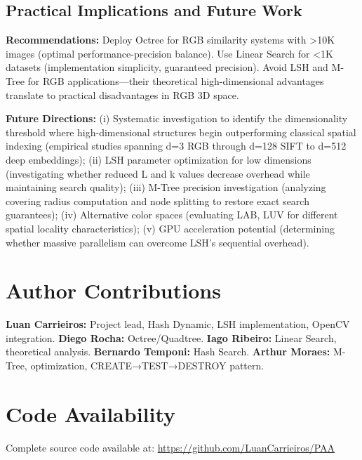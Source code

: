 \documentclass{sbc2023}
\begin{document}
\subsection{Practical Implications and Future Work}

\textbf{Recommendations:} Deploy Octree for RGB similarity systems with >10K images (optimal performance-precision balance). Use Linear Search for <1K datasets (implementation simplicity, guaranteed precision). Avoid LSH and M-Tree for RGB applications—their theoretical high-dimensional advantages translate to practical disadvantages in RGB 3D space.

\textbf{Future Directions:} (i) Systematic investigation to identify the dimensionality threshold where high-dimensional structures begin outperforming classical spatial indexing (empirical studies spanning d=3 RGB through d=128 SIFT to d=512 deep embeddings); (ii) LSH parameter optimization for low dimensions (investigating whether reduced L and k values decrease overhead while maintaining search quality); (iii) M-Tree precision investigation (analyzing covering radius computation and node splitting to restore exact search guarantees); (iv) Alternative color spaces (evaluating LAB, LUV for different spatial locality characteristics); (v) GPU acceleration potential (determining whether massive parallelism can overcome LSH's sequential overhead).


\section*{Author Contributions}
\textbf{Luan Carrieiros:} Project lead, Hash Dynamic, LSH implementation, OpenCV integration. \textbf{Diego Rocha:} Octree/Quadtree. \textbf{Iago Ribeiro:} Linear Search, theoretical analysis. \textbf{Bernardo Temponi:} Hash Search. \textbf{Arthur Moraes:} M-Tree, optimization, CREATE→TEST→DESTROY pattern.

\section*{Code Availability}
Complete source code available at: \url{https://github.com/LuanCarrieiros/PAA}



\end{document}
